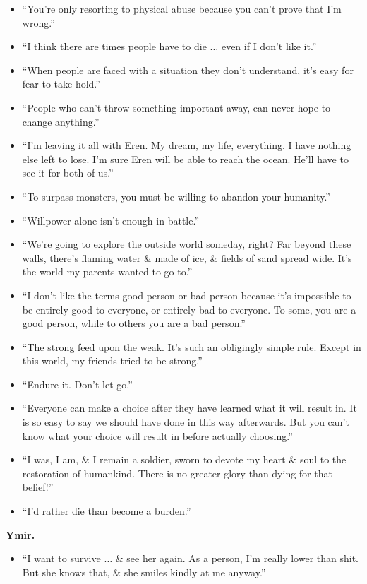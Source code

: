 \documentclass{article}
\begin{document}
\begin{enumerate}
\begin{itemize}
		\item ``You're only resorting to physical abuse because you can't prove that I'm wrong.''
		\item ``I think there are times people have to die $\ldots$ even if I don't like it.''
		\item ``When people are faced with a situation they don't understand, it's easy for fear to take hold.''
		\item ``People who can't throw something important away, can never hope to change anything.''
		\item ``I'm leaving it all with Eren. My dream, my life, everything. I have nothing else left to lose. I'm sure Eren will be able to reach the ocean. He'll have to see it for both of us.''
		\item ``To surpass monsters, you must be willing to abandon your humanity.''
		\item ``Willpower alone isn't enough in battle.''
		\item ``We're going to explore the outside world someday, right? Far beyond these walls, there's flaming water \& made of ice, \& fields of sand spread wide. It's the world my parents wanted to go to.''
		\item ``I don't like the terms good person or bad person because it's impossible to be entirely good to everyone, or entirely bad to everyone. To some, you are a good person, while to others you are a bad person.''
		\item ``The strong feed upon the weak. It's such an obligingly simple rule. Except in this world, my friends tried to be strong.''
		\item ``Endure it. Don't let go.''
		\item ``Everyone can make a choice after they have learned what it will result in. It is so easy to say we should have done in this way afterwards. But you can't know what your choice will result in before actually choosing.''
		\item ``I was, I am, \& I remain a soldier, sworn to devote my heart \& soul to the restoration of humankind. There is no greater glory than dying for that belief!''
		\item ``I'd rather die than become a burden.''
	\end{itemize}
	{\bf Ymir.}
	\begin{itemize}
		\item ``I want to survive $\ldots$ \& see her again. As a person, I'm really lower than shit. But she knows that, \& she smiles kindly at me anyway.''

\end{itemize}
\end{enumerate}
\end{document}
